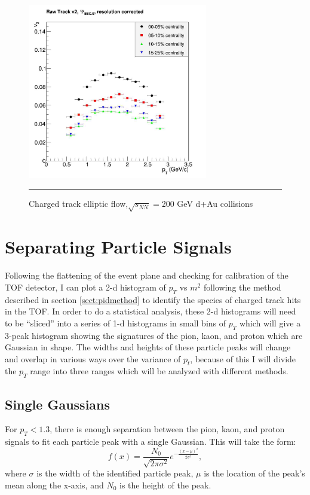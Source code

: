 \begin{figure}[htbp!]
  \centering
    \includegraphics[width=0.7\textwidth]{chargedtrackv2/rawtrackv2_bbcNS.jpg}
    \rule{35em}{0.5pt}
  \caption[Charged track elliptic flow,$\sqrt{s_{NN}}=$200 GeV d+Au collisions]{Charged track elliptic flow,$\sqrt{s_{NN}}=$200 GeV d+Au collisions}
  \label{fig:alltrackv2}
\end{figure}
\section{Separating Particle Signals}
Following the flattening of the event plane and checking for calibration of the TOF detector, I can plot a 2-d histogram of $p_T$ vs $m^2$ following the method described in section \ref{sect:pidmethod} to identify the species of charged track hits in the TOF. In order to do a statistical analysis, these 2-d histograms will need to be ``sliced'' into a series of 1-d histograms in small bins of $p_T$ which will give a 3-peak histogram showing the signatures of the pion, kaon, and proton which are Gaussian in shape. The widths and heights of these particle peaks will change and overlap in various ways over the variance of $p_t$, because of this I will divide the $p_T$ range into three ranges which will be analyzed with different methods.  
\subsection{Single Gaussians}
For $p_T< 1.3$, there is enough separation between the pion, kaon, and proton signals to fit each particle peak with a single Gaussian. This will take the form:
\begin{equation}
f(x) = \frac{N_0}{\sqrt{2\pi \sigma^2}} e^{-\frac{(x-\mu)^2}{2\sigma^{2}}},
\end{equation}
where $\sigma$ is the width of the identified particle peak, $\mu$ is the location of the peak's mean along the x-axis, and $N_0$ is the height of the peak.

